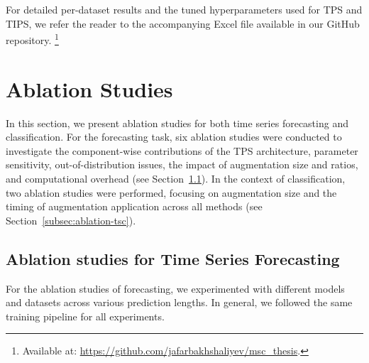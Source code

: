 For detailed per-dataset results and the tuned hyperparameters used for TPS and TIPS, we refer the reader to the accompanying Excel file available in our GitHub repository. \footnote{Available at: \href{https://github.com/jafarbakhshaliyev/msc_thesis/blob/main/results/results_tsf_tsc.xlsx}{https://github.com/jafarbakhshaliyev/msc_thesis}.}



\section{Ablation Studies} \label{sec:ablation}

In this section, we present ablation studies for both time series forecasting and classification. For the forecasting task, six ablation studies were conducted to investigate the component-wise contributions of the TPS architecture, parameter sensitivity, out-of-distribution issues, the impact of augmentation size and ratios, and computational overhead (see Section~\ref{subsec:ablation-tsf}). In the context of classification, two ablation studies were performed, focusing on augmentation size and the timing of augmentation application across all methods (see Section~\ref{subsec:ablation-tsc}).

\subsection{Ablation studies for Time Series Forecasting} \label{subsec:ablation-tsf}

For the ablation studies of forecasting, we experimented with different models and datasets across various prediction lengths. In general, we followed the same training pipeline for all experiments.


